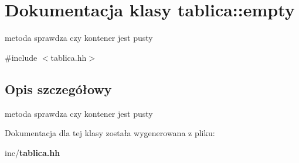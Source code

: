 \section{Dokumentacja klasy tablica\+:\+:empty}
\label{classtablica_1_1empty}


metoda sprawdza czy kontener jest pusty  




{\ttfamily \#include $<$tablica.\+hh$>$}



\subsection{Opis szczegółowy}
metoda sprawdza czy kontener jest pusty 

Dokumentacja dla tej klasy została wygenerowana z pliku\+:\begin{DoxyCompactItemize}
\item 
inc/{\bf tablica.\+hh}\end{DoxyCompactItemize}
